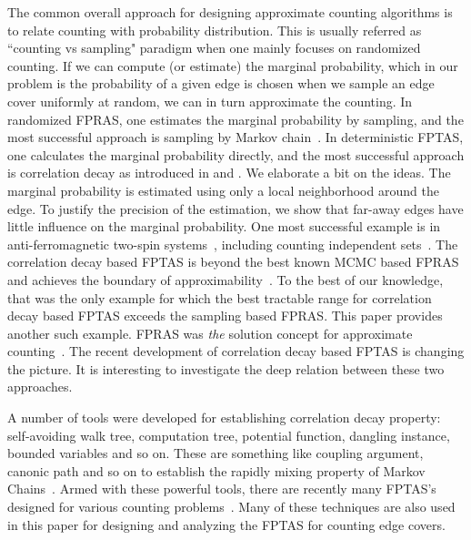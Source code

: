 The common overall approach for designing approximate counting algorithms is to relate counting with probability distribution.
 This is usually referred as ``counting vs sampling" paradigm when one mainly focuses on randomized counting.  If we can compute (or estimate) the marginal probability, which in our problem is the probability of a given edge is chosen when we sample an edge cover uniformly at random, we can in turn approximate  the counting. In randomized FPRAS, one estimates the marginal probability by sampling, and the most successful approach is sampling by Markov chain~\cite{MC_JA96}.
In deterministic FPTAS, one calculates the marginal probability directly, and the most successful approach is correlation decay as introduced in \cite{BG08} and \cite{Weitz06}. We elaborate a bit on the ideas.
 The marginal probability is estimated using only a local neighborhood around the edge. To justify the precision of the estimation, we show that far-away edges have little influence on the marginal probability.
One most successful example is in anti-ferromagnetic two-spin systems~\cite{LLY12,SST,LLY13}, including counting independent sets~\cite{Weitz06}. The correlation decay based FPTAS is beyond the best known MCMC based FPRAS and achieves the boundary of approximability~\cite{SS12,galanis2012inapproximability}.
To the best of our knowledge, that was the only example for which the best tractable range for correlation decay based FPTAS exceeds the sampling based FPRAS. This paper provides another such example. FPRAS was \emph{the} solution concept for approximate counting~\cite{dich_DGGJ00}. The recent development of correlation decay based FPTAS is changing the picture. It is interesting to investigate the deep relation between these two approaches.

A number of tools were developed for establishing correlation decay property: self-avoiding walk tree, computation tree, potential function, dangling instance, bounded variables and so on. These are something like coupling argument, canonic path and so on to establish the rapidly mixing property of Markov Chains~\cite{MC_JA96}.
Armed with these powerful tools, there are recently many FPTAS's designed for various counting problems~\cite{LLY12,SST,LLY13,YZ13,fibo-approx}.
Many of these techniques are also used in this paper for designing and analyzing the FPTAS for counting edge covers.

